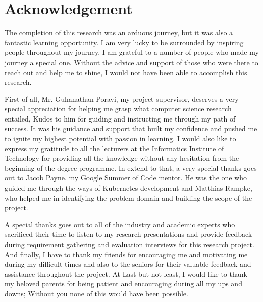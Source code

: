 \chapter*{Acknowledgement}

The completion of this research was an arduous journey, but it was also a fantastic learning opportunity. I am very lucky to be surrounded by inspiring people throughout my journey. I am grateful to a number of people who made my journey a special one.
Without the advice and support of those who were there to reach out and help me to shine, I would not have been able to accomplish this research.

First of all, Mr. Guhanathan Poravi, my project supervisor, deserves a very special appreciation for helping me grasp what computer science research entailed, Kudos to him for guiding and instructing me through my path of success. It was his guidance and support that built my confidence and pushed me to ignite my highest potential with passion in learning. I would also like to express my gratitude to all the lecturers at the Informatics Institute of Technology for providing all the knowledge without any hesitation from the beginning of the degree programme. In extend to that, a very special thanks goes out to Jacob Payne, my Google Summer of Code mentor. He was the one who guided me through the ways of Kubernetes development and Matthias Rampke, who helped me in identifying the problem domain and building the scope of the project. 

A special thanks goes out to all of the industry and academic experts who sacrificed their time to listen to my research presentations and provide feedback during requirement gathering and evaluation interviews for this research project. And finally, I have to thank my friends for encouraging me and motivating me during my difficult times and also to the seniors for their valuable feedback and assistance throughout the project. At Last but not least, I would like to thank my beloved parents for being patient and encouraging during all my ups and downs; Without you none of this would have been possible. 







